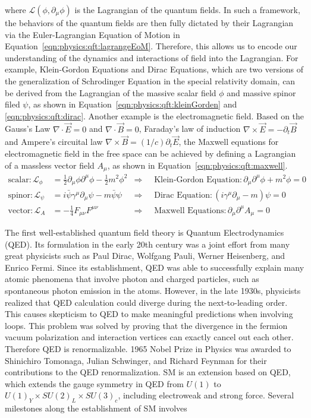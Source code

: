 \noindent where $\mathcal{L}(\phi, \partial_\mu \phi)$ is the Lagrangian of the quantum fields. In such a framework, the behaviors of the quantum fields are then fully dictated by their Lagrangian via the Euler-Lagrangian Equation of Motion in Equation~\ref{eqn:physics:qft:lagrangeEoM}. Therefore, this allows us to encode our understanding of the dynamics and interactions of field into the Lagrangian. For example, Klein-Gordon Equations and Dirac Equations, which are two versions of the generalization of Schrodinger Equation in the special relativity domain, can be derived from the Lagrangian of the massive scalar field $\phi$ and massive spinor filed $\psi$, as shown in Equation~\ref{eqn:physics:qft:kleinGorden} and \ref{eqn:physics:qft:dirac}. Another example is the electromagnetic field. Based on the Gauss's Law $\nabla \cdot \vec{E} = 0$ and $\nabla \cdot \vec{B} = 0$, Faraday's law of induction $\nabla \times \vec{E} = - \partial_t \vec{B}$ and Ampere's circuital law $\nabla \times \vec{B} = (1/c) \partial_t \vec{E}$, the Maxwell equations for electromagnetic field in the free space can be achieved by defining a Lagrangian of a massless vector field $A_\mu$, as shown in Equation~\ref{eqn:physics:qft:maxwell}.
\begin{align}
    \text{scalar:} \,
    \mathcal{L}_\phi &= \frac{1}{2} \partial_\mu\phi \partial^\mu \phi - \frac{1}{2} m^2 \phi^2 
        &\Longrightarrow& \;  \text{ Klein-Gordon Equation:} \, \partial_\mu \partial^\mu \phi + m^2 \phi = 0 \label{eqn:physics:qft:kleinGorden}\\
    \text{spinor:} \,
    \mathcal{L}_\psi &= i \bar{\psi}\gamma^\mu \partial_\mu \psi - m \bar{\psi} \psi 
        &\Longrightarrow& \; \text{ Dirac Equation:}  \, (i\gamma^\mu\partial_\mu - m) \psi = 0 \label{eqn:physics:qft:dirac} \\
    \text{vector:} \,
    \mathcal{L}_A &= -\frac{1}{4}F_{\mu\nu} F^{\mu \nu} 
        &\Longrightarrow& \; \text{ Maxwell Equations:} \, \partial_\mu \partial^\mu A_\mu = 0 \label{eqn:physics:qft:maxwell}
\end{align}


The first well-established quantum field theory is Quantum Electrodynamics (QED). Its formulation in the early 20th century was a joint effort from many great physicists such as Paul Dirac, Wolfgang Pauli, Werner Heisenberg, and Enrico Fermi. Since its establishment, QED was able to successfully explain many atomic phenomena that involve photon and charged particles, such as spontaneous photon emission in the atoms. However, in the late 1930s, physicists realized that QED calculation could diverge during the next-to-leading order. This causes skepticism to QED to make meaningful predictions when involving loops. This problem was solved by proving that the divergence in the fermion vacuum polarization and interaction vertices can exactly cancel out each other. Therefore QED is renormalizable. 1965 Nobel Prize in Physics was awarded to Shinichiro Tomonaga, Julian Schwinger, and Richard Feynman for their contributions to the QED renormalization. SM is an extension based on QED, which extends the gauge symmetry in QED from $U(1)$ to $U(1)_Y \times SU(2)_L \times SU(3)_c$, including electroweak and strong force. Several milestones along the establishment of SM involves

